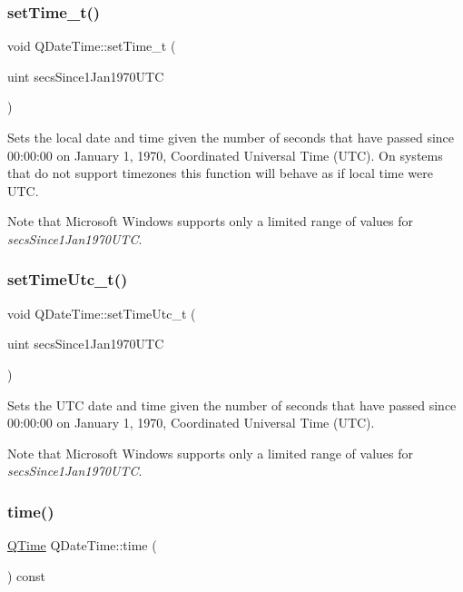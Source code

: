 \subsubsection{\texorpdfstring{setTime\_t()}{setTime\_t()}}
{\footnotesize\ttfamily void Q\+Date\+Time\+::set\+Time\+\_\+t (\begin{DoxyParamCaption}\item[{uint}]{secs\+Since1\+Jan1970\+U\+TC }\end{DoxyParamCaption})}

Sets the local date and time given the number of seconds that have passed since 00\+:00\+:00 on January 1, 1970, Coordinated Universal Time (U\+TC). On systems that do not support timezones this function will behave as if local time were U\+TC.

Note that Microsoft Windows supports only a limited range of values for {\itshape secs\+Since1\+Jan1970\+U\+TC}. \mbox{\label{class_q_date_time_a9230e2178c9706ae658df2fd7d255b55}} 
\subsubsection{\texorpdfstring{setTimeUtc\_t()}{setTimeUtc\_t()}}
{\footnotesize\ttfamily void Q\+Date\+Time\+::set\+Time\+Utc\+\_\+t (\begin{DoxyParamCaption}\item[{uint}]{secs\+Since1\+Jan1970\+U\+TC }\end{DoxyParamCaption})}

Sets the U\+TC date and time given the number of seconds that have passed since 00\+:00\+:00 on January 1, 1970, Coordinated Universal Time (U\+TC).

Note that Microsoft Windows supports only a limited range of values for {\itshape secs\+Since1\+Jan1970\+U\+TC}. \mbox{\label{class_q_date_time_a7b8eefbd04093747deb22f5cd6b673c1}} 
\subsubsection{\texorpdfstring{time()}{time()}}
{\footnotesize\ttfamily \mbox{\hyperlink{class_q_time}{Q\+Time}} Q\+Date\+Time\+::time (\begin{DoxyParamCaption}{ }\end{DoxyParamCaption}) const\hspace{0.3cm}{\ttfamily [inline]}}

